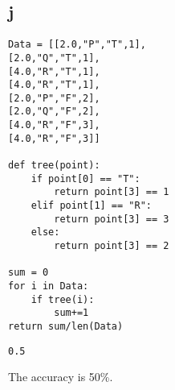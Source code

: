 \documentclass[11pt]{article}
\begin{document}
\subsection*{j}
\label{sec:org8eaf655}
\begin{verbatim}
Data = [[2.0,"P","T",1],
[2.0,"Q","T",1],
[4.0,"R","T",1],
[4.0,"R","T",1],
[2.0,"P","F",2],
[2.0,"Q","F",2],
[4.0,"R","F",3],
[4.0,"R","F",3]]

def tree(point):
    if point[0] == "T":
        return point[3] == 1
    elif point[1] == "R":
        return point[3] == 3
    else:
        return point[3] == 2

sum = 0
for i in Data:
    if tree(i):
        sum+=1
return sum/len(Data)
\end{verbatim}

\begin{verbatim}
0.5
\end{verbatim}


The accuracy is 50\%.
\end{document}
